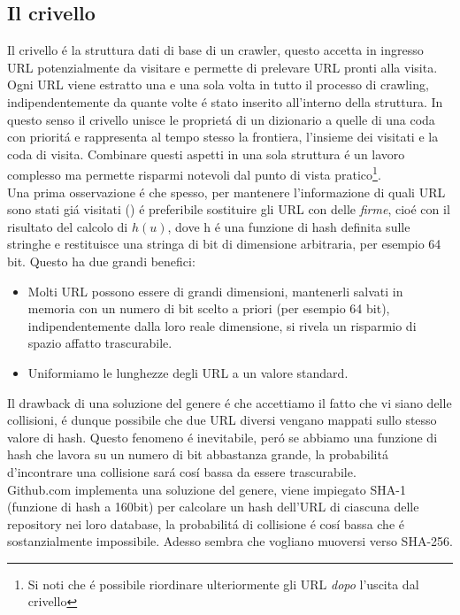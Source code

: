 \subsection{Il crivello}
Il crivello é la struttura dati di base di un crawler, questo accetta in ingresso URL potenzialmente da visitare e permette di prelevare URL pronti alla visita. Ogni URL viene estratto una e una sola volta in tutto il processo di crawling, indipendentemente da quante volte é stato inserito all'interno della struttura. In questo senso il crivello unisce le proprietá di un dizionario a quelle di una coda con prioritá e rappresenta al tempo stesso la frontiera, l'insieme dei visitati e la coda di visita. Combinare questi aspetti in una sola struttura é un lavoro complesso ma permette risparmi notevoli dal punto di vista pratico\footnote{Si noti che é possibile riordinare ulteriormente gli URL \textit{dopo} l'uscita dal crivello}.\\
Una prima osservazione é che spesso, per mantenere l'informazione di quali URL sono stati giá visitati () é preferibile sostituire gli URL con delle \textit{firme}, cioé con il risultato del calcolo di $h(u)$, dove h é una funzione di hash definita sulle stringhe e restituisce una stringa di bit di dimensione arbitraria, per esempio 64 bit. Questo ha due grandi benefici:
\begin{itemize}
    \item Molti URL possono essere di grandi dimensioni, mantenerli salvati in memoria con un numero di bit scelto a priori (per esempio 64 bit), indipendentemente dalla loro reale dimensione, si rivela un risparmio di spazio affatto trascurabile.
    \item Uniformiamo le lunghezze degli URL a un valore standard.
\end{itemize}
Il drawback di una soluzione del genere é che accettiamo il fatto che vi siano delle collisioni, é dunque possibile che due URL diversi vengano mappati sullo stesso valore di hash. Questo fenomeno é inevitabile, peró se abbiamo una funzione di hash che lavora su un numero di bit abbastanza grande, la probabilitá d'incontrare una collisione sará cosí bassa da essere trascurabile.\\
Github.com implementa una soluzione del genere, viene impiegato SHA-1 (funzione di hash a 160bit) per calcolare un hash dell'URL di ciascuna delle repository nei loro database, la probabilitá di collisione é cosí bassa che é sostanzialmente impossibile. Adesso sembra che vogliano muoversi verso SHA-256.\\
